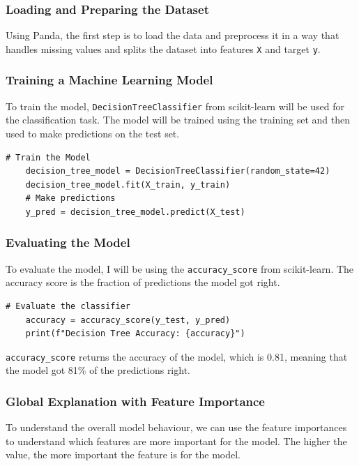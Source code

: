 \documentclass[10pt,journal,compsoc]{IEEEtran}
\begin{document}
\subsubsection{Loading and Preparing the Dataset}
Using Panda, the first step is to load the data and preprocess it in a way that handles missing values and splits the dataset into features \texttt{X} and target \texttt{y}.

\subsubsection{Training a Machine Learning Model}
To train the model, \texttt{DecisionTreeClassifier} from scikit-learn will be used for the classification task. The model will be trained using the training set and then used to make predictions on the test set.

\begin{lstlisting}[caption=Training a Decision Tree Classifier]
    # Train the Model
    decision_tree_model = DecisionTreeClassifier(random_state=42)
    decision_tree_model.fit(X_train, y_train)
    # Make predictions
    y_pred = decision_tree_model.predict(X_test)
\end{lstlisting}

\subsubsection{Evaluating the Model}
To evaluate the model, I will be using the \texttt{accuracy\_score} from scikit-learn. The accuracy score is the fraction of predictions the model got right.

\begin{lstlisting}[caption=Evaluating the Model]
    # Evaluate the classifier
    accuracy = accuracy_score(y_test, y_pred)
    print(f"Decision Tree Accuracy: {accuracy}")
\end{lstlisting}

\texttt{accuracy\_score} returns the accuracy of the model, which is 0.81, meaning that the model got 81\% of the predictions right.

\subsubsection{Global Explanation with Feature Importance
}

To understand the overall model behaviour, we can use the feature importances to understand which features are more important for the model. The higher the value, the more important the feature is for the model.
\end{document}
